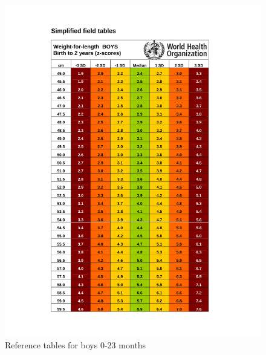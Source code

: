\documentclass[
  12pt,
]{book}
\begin{document}
\begin{figure}[H]

{\centering \includegraphics[width=1\linewidth]{pdf/boys_0_24} 

}

\caption{Reference tables for boys 0-23 months}\label{fig:anthro1-1}
\end{figure}
\end{document}
